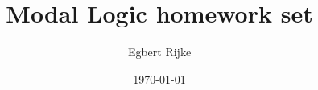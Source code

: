 \title{Modal Logic homework set \hwnumber}
\author{Egbert Rijke}
\date\today

\usepackage{mathpazo}
\usepackage{amsmath,amsthm,amssymb,stmaryrd}
\usepackage{tikz-cd}
\usepackage{xcolor}

\renewcommand{\theenumi}{\alph{enumi}}
\renewcommand{\labelenumi}{(\theenumi)}

\newcommand{\note}[1]{{\color{red}#1}}

\newcommand{\lsem}{\llbracket}
\newcommand{\rsem}{\rrbracket}
\newcommand{\nec}{\square}
\newcommand{\pos}{\lozenge}
\renewcommand{\models}{\vDash}
\newcommand{\nmodels}{\nvDash}

\newtheorem{thm}{Theorem}
\theoremstyle{definition}
\newtheorem{ex}{Exercise}

